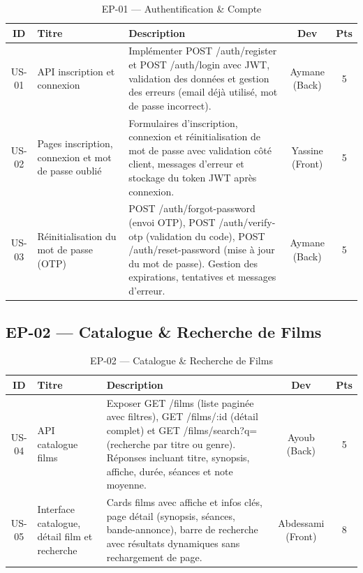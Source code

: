\documentclass[12pt]{report}
\begin{document}
\begin{table}[H]
\centering
\renewcommand{\arraystretch}{1.45}
\begin{tabular}{|c|p{3.8cm}|p{6.2cm}|c|c|}
\hline
\rowcolor{gray!20}
\textbf{ID} & \textbf{Titre} & \textbf{Description} 
            & \textbf{Dev} & \textbf{Pts} \\
\hline
US-01 &
API inscription et connexion &
Implémenter POST /auth/register et POST /auth/login
avec JWT, validation des données et gestion des erreurs
(email déjà utilisé, mot de passe incorrect).
&
Aymane (Back) & 5 \\
\hline
US-02 &
Pages inscription, connexion et mot de passe oublié &
Formulaires d'inscription, connexion et réinitialisation
de mot de passe avec validation côté client, messages
d'erreur et stockage du token JWT après connexion. &
Yassine (Front) & 5 \\
\hline
US-03 &
Réinitialisation du mot de passe (OTP) &
POST /auth/forgot-password (envoi OTP),
POST /auth/verify-otp (validation du code),
POST /auth/reset-password (mise à jour du mot de passe).
Gestion des expirations, tentatives et messages d'erreur. &
Aymane (Back) & 5 \\
\hline
\end{tabular}
\caption{EP-01 — Authentification \& Compte}
\label{tab:ep01}
\end{table}
 
\subsection*{EP-02 — Catalogue \& Recherche de Films}
 
\begin{table}[H]
\centering
\renewcommand{\arraystretch}{1.45}
\begin{tabular}{|c|p{3.8cm}|p{6.2cm}|c|c|}
\hline
\rowcolor{gray!20}
\textbf{ID} & \textbf{Titre} & \textbf{Description}
            & \textbf{Dev} & \textbf{Pts} \\
\hline
US-04 &
API catalogue films &
Exposer GET /films (liste paginée avec filtres),
GET /films/:id (détail complet) et
GET /films/search?q= (recherche par titre ou genre).
Réponses incluant titre, synopsis, affiche, durée,
séances et note moyenne. &
Ayoub (Back) & 5 \\
\hline
US-05 &
Interface catalogue, détail film et recherche &
Cards films avec affiche et infos clés, page détail
(synopsis, séances, bande-annonce), barre de recherche
avec résultats dynamiques sans rechargement de page. &
Abdessami (Front) & 8 \\
\hline
\end{tabular}
\caption{EP-02 — Catalogue \& Recherche de Films}
\label{tab:ep02}
\end{table}
 
\end{document}
